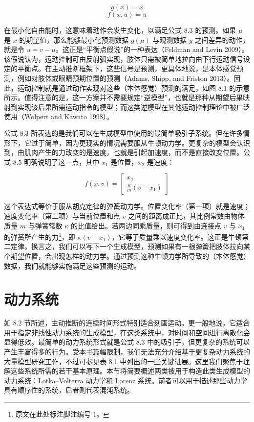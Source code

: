 \[
g(x) = x
\tag{8.4}
\]
\[
f(x,u) = u
\]

在最小化自由能时，这意味着动作会发生变化，以满足公式 8.3 的预测。如果 $\mu$ 是 $x$ 的期望值，那么能够最小化预测数据 $g(\mu)$ 与观测数据 $y$ 之间差异的动作，就是令 $u = v - \mu$。这正是“平衡点假说”的一种表达（Feldman and Levin 2009）。该假说认为，运动控制可由反射弧实现，肢体只需被简单地拉向由下行运动信号设定的平衡点。在主动推断框架下，这些信号是预测，更具体地说，是本体感觉预测，例如对肢体或眼睛预期位置的预测（Adams, Shipp, and Friston 2013）。因此，运动控制就是通过动作实现对这些（本体感觉）预测的满足，如图 8.1 的示意所示。值得注意的是，这一方案并不需要规定“逆模型”，也就是那种从期望后果映射到实现该后果所需运动指令的模型；而这类逆模型在其他运动控制理论中被广泛使用（Wolpert and Kawato 1998）。

公式 8.3 所表达的是我们可以在生成模型中使用的最简单吸引子系统。但在许多情形下，它过于简单，因为更现实的情况需要服从牛顿动力学。更复杂的模型会认识到，由肌肉产生的力改变的是速度，也就是引起加速度，而不是直接改变位置。公式 8.5 明确说明了这一点，其中 $x_1$ 是位置，$x_2$ 是速度：

\[
f(x,v) =
\begin{bmatrix}
x_2 \\
\frac{\kappa}{m}(v - x_1)
\end{bmatrix}
\tag{8.5}
\]

这个表达式等价于服从胡克定律的弹簧动力学。位置变化率（第一项）就是速度；速度变化率（第二项）与当前位置和点 $v$ 之间的距离成正比，其比例常数由物体质量 $m$ 与弹簧常数 $\kappa$ 的比值给出。若两边同乘质量，则可得到由连接点 $v$ 与 $x_1$ 的弹簧所产生的力\footnote{原文在此处标注脚注编号 1。}，即 $\kappa(v - x_1)$，它等于质量乘以速度变化率。这正是牛顿第二定律。换言之，我们可以写下一个生成模型，预测如果有一根弹簧把肢体拉向某个期望位置，会出现怎样的动力学。通过预测这种牛顿力学所导致的（本体感觉）数据，我们就能够实施满足这些预测的运动。

\section{动力系统}

如 8.2 节所述，主动推断的连续时间形式特别适合刻画运动。更一般地说，它适合用于指定非线性动力系统的生成模型，在这类系统中，对时间和空间进行离散化会显得低效。最简单的动力系统形式就是公式 8.3 中的吸引子，但更复杂的系统可以产生丰富得多的行为。受本书篇幅限制，我们无法充分介绍基于更复杂动力系统的大量模型研究工作，不过可参见表 8.1 中列出的一些关键进展。这里我们聚焦于理解这些系统所需的若干基本原理。本节将简要概述两类被用于构造此类生成模型的动力系统：Lotka--Volterra 动力学和 Lorenz 系统。前者可以用于描述那些动力学具有顺序性的系统，后者则代表混沌系统。

